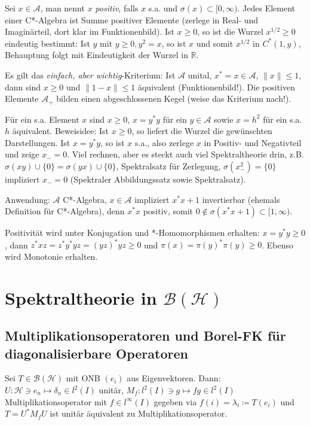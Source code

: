 \documentclass[11pt,a4paper]{scrartcl}
\newcommand{\R}{\mathbb{R}} %
\newcommand{\Hc}{\mathcal{H}}
\newcommand{\A}{\mathcal{A}}
\newcommand{\B}{\mathcal{B}}
\theoremstyle{plain}
\theoremstyle{definition}
\theoremstyle{remark}
\begin{document}
Sei $x\in \A$, man nennt $x$ \emph{positiv}, falls $x$ s.a. und $\sigma(x) \subset [0,\infty)$. Jedes Element einer C*-Algebra ist Summe positiver Elemente (zerlege in Real- und Imaginärteil, dort klar im Funktionenbild). Ist $x \geq 0$, so ist die Wurzel $x^{1/2} \geq 0$ eindeutig bestimmt: Ist $y$ mit $y \geq 0, y^2=x$, so ist $x$ und somit $x^{1/2}$ in $C^*(1,y)$, Behauptung folgt mit Eindeutigkeit der Wurzel in $\R$.

Es gilt das \emph{einfach, aber wichtig}-Kriterium: Ist $\A$ unital, $x^*=x\in \A$, $\|x\| \leq 1$, dann sind $x\geq 0$ und $\|1-x\|\leq 1$ äquivalent (Funktionenbild!). Die positiven Elemente $\A_+$ bilden einen abgeschlossenen Kegel (weise das Kriterium nach!).

Für ein s.a. Element $x$ sind $x\geq 0$, $x=y^*y$ für ein $y\in \A$ sowie $x=h^2$ für ein s.a. $h$ äquivalent. Beweisidee: Ist $x \geq 0$, so liefert die Wurzel die gewünschten Darstellungen. Ist $x=y^*y$, so ist $x$ s.a., also zerlege $x$ in Positiv- und Negativteil und zeige $x_-=0$. Viel rechnen, aber es steckt auch viel Spektraltheorie drin, z.B. $\sigma(xy) \cup \{0\} = \sigma(yx) \cup \{0 \}$, Spektralsatz für Zerlegung, $\sigma(x_-^2)=\{0\}$ impliziert $x_-=0$ (Spektraler Abbildungssatz sowie Spektralsatz).

Anwendung: $\A$ C*-Algebra, $x\in \A$ impliziert $x^*x+1$ invertierbar (ehemals Definition für C*-Algebra), denn $x^*x$ positiv, somit $0\not\in \sigma(x^*x+1) \subset [1,\infty)$.

Positivität wird unter Konjugation und *-Homomorphismen erhalten: $x=y^*y\geq 0$, dann $z^*xz=z^*y^*yz=(yz)^*yz \geq0$ und $\pi(x)=\pi(y)^*\pi(y) \geq 0$. Ebenso wird Monotonie erhalten.

\section{Spektraltheorie in $\B(\Hc)$}

\subsection{Multiplikationsoperatoren und Borel-FK für diagonalisierbare Operatoren}

Sei $T\in \B(\Hc)$ mit ONB $(e_i)$ aus Eigenvektoren. Dann: $U: \Hc \ni e_n \mapsto \delta_n \in l^2(I)$ unitär, $M_f: l^2(I) \ni g \mapsto fg \in l^2(I)$ Multiplikationsoperator mit $f\in l^\infty(I)$ gegeben via $f(i)=\lambda_i\coloneqq T(e_i)$ und $T=U^*M_f U$ ist unitär äquivalent zu Multiplikationsoperator.
\end{document}
